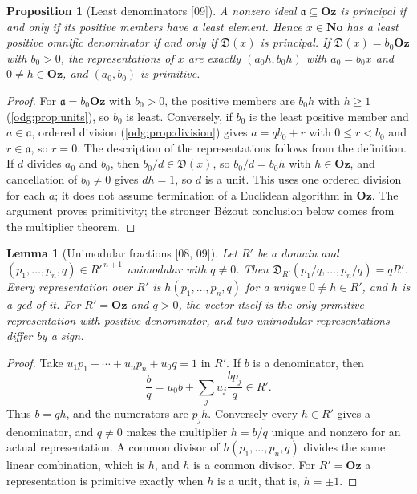 \documentclass[11pt,oneside]{article}
\numberwithin{equation}{section}
\newtheorem{proposition}[proposition]{Proposition}
\newtheorem{lemma}[lemma]{Lemma}
\theoremstyle{definition}
\theoremstyle{remark}
\newcommand{\No}{\mathbf{No}}
\newcommand{\Oz}{\mathbf{Oz}}
\newcommand{\src}[1]{\textup{\textsf{\small[#1]}}}
\newcommand{\Den}{\mathfrak D}
\begin{document}
\begin{proposition}[Least denominators \src{09}]\label{odg:frac:prop:least}
A nonzero ideal $\mathfrak a\subseteq\Oz$ is principal if and only if its positive
members have a least element. Hence $x\in\No$ has a least positive omnific
denominator if and only if $\Den(x)$ is principal. If $\Den(x)=b_0\Oz$ with
$b_0>0$, the representations of $x$ are exactly $(a_0h,b_0h)$ with
$a_0=b_0x$ and $0\ne h\in\Oz$, and $(a_0,b_0)$ is primitive.
\end{proposition}
\begin{proof}
For $\mathfrak a=b_0\Oz$ with $b_0>0$, the positive members are $b_0h$ with
$h\ge1$ (\cref{odg:prop:units}), so $b_0$ is least. Conversely, if $b_0$ is the
least positive member and $a\in\mathfrak a$, ordered division
(\cref{odg:prop:division}) gives $a=qb_0+r$ with $0\le r<b_0$ and
$r\in\mathfrak a$, so $r=0$. The description of the representations follows
from the definition. If $d$ divides $a_0$ and $b_0$, then $b_0/d\in\Den(x)$, so
$b_0/d=b_0h$ with $h\in\Oz$, and cancellation of $b_0\ne0$ gives $dh=1$, so $d$ is a unit.
This uses one ordered division for each $a$; it does not assume termination
of a Euclidean algorithm in $\Oz$. The argument proves primitivity;
the stronger B\'ezout conclusion below comes from the multiplier theorem.
\end{proof}

\begin{lemma}[Unimodular fractions \src{08, 09}]\label{odg:frac:lem:unimodular}
Let $R'$ be a domain and $(p_1,\ldots,p_n,q)\in R'^{\,n+1}$ unimodular with
$q\ne0$. Then $\Den_{R'}(p_1/q,\ldots,p_n/q)=qR'$. Every representation over
$R'$ is $h(p_1,\ldots,p_n,q)$ for a unique $0\ne h\in R'$, and $h$ is a gcd of
it. For $R'=\Oz$ and $q>0$, the vector itself is the only primitive
representation with positive denominator, and two unimodular representations
differ by a sign.
\end{lemma}
\begin{proof}
Take $u_1p_1+\cdots+u_np_n+u_0q=1$ in $R'$. If $b$ is a denominator, then
\[
 \frac bq=u_0b+\sum_ju_j\frac{bp_j}{q}\in R'.
\]
Thus $b=qh$, and the numerators are $p_jh$. Conversely every $h\in R'$ gives
a denominator, and $q\ne0$ makes the multiplier $h=b/q$ unique and nonzero
for an actual representation. A common divisor of $h(p_1,\ldots,p_n,q)$ divides the same
linear combination, which is $h$, and $h$ is a common divisor. For $R'=\Oz$ a
representation is primitive exactly when $h$ is a unit, that is, $h=\pm1$.
\end{proof}
\end{document}
